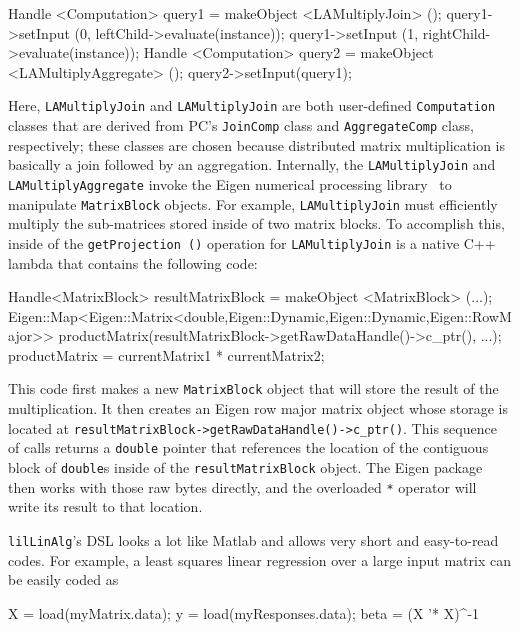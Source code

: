 \begin{codesmall}
Handle <Computation> query1 = makeObject <LAMultiplyJoin> ();
query1->setInput (0, leftChild->evaluate(instance));
query1->setInput (1, rightChild->evaluate(instance));
Handle <Computation> query2 = makeObject <LAMultiplyAggregate> ();
query2->setInput(query1);
\end{codesmall}

\noindent Here, \texttt{LAMultiplyJoin} and \texttt{LAMultiplyJoin} are 
both user-defined \texttt{Computation} classes that are
derived from PC's \texttt{JoinComp} class and \texttt{AggregateComp} class, respectively; these classes are chosen 
because distributed matrix multiplication
is basically a join followed by an aggregation.
Internally, the \texttt{LAMultiplyJoin}
and \texttt{LAMultiplyAggregate} invoke the Eigen numerical processing
library~\cite{eigen} to manipulate \texttt{MatrixBlock} objects.
For example, \texttt{LAMultiplyJoin} must efficiently multiply the sub-matrices stored inside of two matrix blocks.
To accomplish this, inside of the \texttt{getProjection ()} operation for
\texttt{LAMultiplyJoin} is a native C++ lambda that contains the following code:

\begin{code}
Handle<MatrixBlock> resultMatrixBlock = makeObject <MatrixBlock> (...);
Eigen::Map<Eigen::Matrix<double,Eigen::Dynamic,Eigen::Dynamic,Eigen::RowMajor>> 
   productMatrix(resultMatrixBlock->getRawDataHandle()->c_ptr(), ...);
productMatrix = currentMatrix1 * currentMatrix2;
\end{code}

\noindent This code first makes a new \texttt{MatrixBlock} object that will store the result of the multiplication.
 It then creates an 
Eigen row major matrix object whose storage is located at 
\texttt{resultMatrixBlock->}\-\texttt{getRaw}\-\texttt{DataHandle()->}\-\texttt{c\_ptr()}.  This
sequence of calls
returns a \texttt{double} pointer that references the location of the contiguous block of \texttt{double}s inside of
the \texttt{resultMatrixBlock} object.
The Eigen package then works with those raw bytes directly,
and the overloaded \texttt{*} operator will write its result to that location.

\texttt{lilLinAlg}'s DSL looks a lot like Matlab and allows very short and easy-to-read codes.
For example, 
a least squares linear regression over a large input matrix can be easily coded as

\begin{code}
X = load(myMatrix.data); 
y = load(myResponses.data); 
beta = (X '* X)^-1 %
\end{code}

